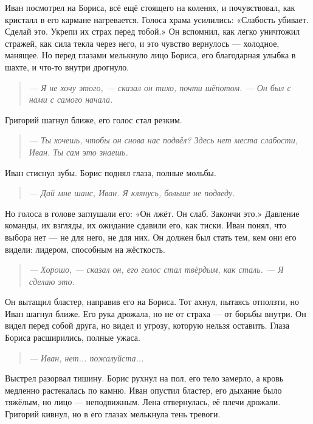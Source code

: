 \documentclass[12pt,a4paper]{book}
\newenvironment{dialogue}{\begin{quote}\itshape}{\end{quote}}
\begin{document}
Иван посмотрел на Бориса, всё ещё стоящего на коленях, и почувствовал, как кристалл в его кармане нагревается. Голоса храма усилились: «Слабость убивает. Сделай это. Укрепи их страх перед тобой.» Он вспомнил, как легко уничтожил стражей, как сила текла через него, и это чувство вернулось --- холодное, манящее. Но перед глазами мелькнуло лицо Бориса, его благодарная улыбка в шахте, и что-то внутри дрогнуло.

\begin{dialogue}
--- Я не хочу этого, --- сказал он тихо, почти шёпотом. --- Он был с нами с самого начала.
\end{dialogue}

Григорий шагнул ближе, его голос стал резким.

\begin{dialogue}
--- Ты хочешь, чтобы он снова нас подвёл? Здесь нет места слабости, Иван. Ты сам это знаешь.
\end{dialogue}

Иван стиснул зубы. Борис поднял глаза, полные мольбы.

\begin{dialogue}
--- Дай мне шанс, Иван. Я клянусь, больше не подведу.
\end{dialogue}

Но голоса в голове заглушали его: «Он лжёт. Он слаб. Закончи это.» Давление команды, их взгляды, их ожидание сдавили его, как тиски. Иван понял, что выбора нет --- не для него, не для них. Он должен был стать тем, кем они его видели: лидером, способным на жёсткость.

\begin{dialogue}
--- Хорошо, --- сказал он, его голос стал твёрдым, как сталь. --- Я сделаю это.
\end{dialogue}

Он вытащил бластер, направив его на Бориса. Тот ахнул, пытаясь отползти, но Иван шагнул ближе. Его рука дрожала, но не от страха --- от борьбы внутри. Он видел перед собой друга, но видел и угрозу, которую нельзя оставить. Глаза Бориса расширились, полные ужаса.

\begin{dialogue}
--- Иван, нет... пожалуйста...
\end{dialogue}

Выстрел разорвал тишину. Борис рухнул на пол, его тело замерло, а кровь медленно растекалась по камню. Иван опустил бластер, его дыхание было тяжёлым, но лицо --- неподвижным. Лена отвернулась, её плечи дрожали. Григорий кивнул, но в его глазах мелькнула тень тревоги.
\end{document}
